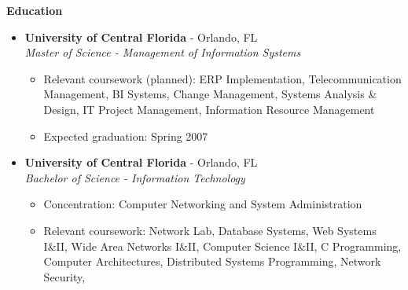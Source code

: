 \documentclass[10pt,oneside]{article}
\newenvironment{ressection}[1]{
	\vspace{4pt}
	\textbf{\selectfont\normalsize#1}
	\begin{itemize}
	\vspace{3pt}
}{
	\end{itemize}
}
\newcommand{\ressubitem}[1]{
	\vspace{-1pt}
	\item \begin{flushleft} #1 \end{flushleft}
}
\newcommand{\resbigitem}[3]{
	\vspace{-5pt}
	\item
	\textbf{#1} - #2 \\
	\textit{#3}
}
\newenvironment{ressubsec}[3]{
	\resbigitem{#1}{#2}{#3}
	\vspace{-2pt}
	\begin{itemize}
}{
	\end{itemize}
}
\begin{document}

\begin{ressection}{Education}

	\begin{ressubsec}{University of Central Florida}{Orlando, FL}{Master of Science - Management of Information Systems}
		\ressubitem{Relevant coursework (planned): ERP Implementation, Telecommunication Management, BI Systems, Change Management, Systems Analysis \& Design, IT Project Management, Information Resource Management}
		\ressubitem{Expected graduation: Spring 2007}
	\end{ressubsec}

	\begin{ressubsec}{University of Central Florida}{Orlando, FL}{Bachelor of Science - Information Technology}
		\ressubitem{Concentration: Computer Networking and System Administration}
		\ressubitem{Relevant coursework: Network Lab, Database Systems, Web Systems I\&II, Wide Area Networks I\&II, Computer Science I\&II, C Programming, Computer Architectures, Distributed Systems Programming, Network Security, }
	\end{ressubsec}

\end{ressection}

\end{document}
